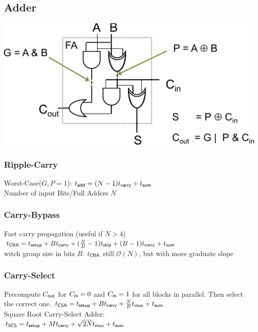 \begin{sectionbox}
    \subsection{Adder}

	\includegraphics[width = \columnwidth]{./img/fa.pdf}
	
	\subsubsection{Ripple-Carry}
	Worst-Case($G,P = 1$): \qquad  $t_{\sf add} = (N-1) t_{\sf carry} + t_{\sf sum}$\\
	Number of input Bits/Full Adders $N$\\
	
	\subsubsection{Carry-Bypass}
	Fast carry propagation (useful if $N > 4$)\\
	$t_{\sf CBA} = t_{\sf setup} + B t_{\sf carry} + (\frac{N}{B} - 1 ) t_{\sf skip} + (B-1)t_{\sf carry} + t_{\sf sum}$\\
	witch group size in bits $B$.
	$t_{\sf CBA}$ still $\mathcal O(N)$, but with more graduate slope
	
	\subsubsection{Carry-Select}
	Precompute $C_{\sf out}$ for $C_{\sf in} = 0$ and $C_{\sf in} = 1$ for all blocks in parallel.
	Then select the correct one.
	$t_{\sf CSA} = t_{\sf setup} + B t_{\sf carry} + \frac{N}{B} t_{\sf mux} + t_{\sf sum}$\\
	Square Root Carry-Select Adder:\\
	$t_{\sf SCS} = t_{\sf setup} + M t_{\sf carry} + \sqrt{2N}t_{\sf mux} + t_{\sf sum}$\\

\end{sectionbox}


